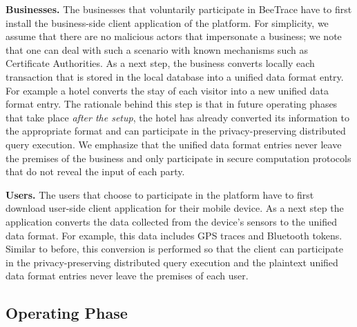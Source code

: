\documentclass[11pt,dvipdfmx]{article}  %
\newcommand{\sysname}{\textsf{BeeTrace}\xspace}
\begin{document}
\textbf{Businesses. }The businesses that voluntarily participate in \sysname have to first install the business-side client application of the platform. For simplicity, we assume that there are no malicious actors that impersonate a business; we note that one can deal with such a scenario with known mechanisms such as Certificate Authorities.
As a next step, the business converts locally each transaction that is stored in the local database into a unified data format entry. 
For example a hotel converts the stay of each visitor into a new unified data format entry. 
The rationale behind this step is that in future operating phases that take place \emph{after the setup}, the hotel has already converted its information to the appropriate format and can participate in the privacy-preserving distributed query execution.  
We emphasize that the unified data format entries never leave the premises of the business and only participate in secure computation protocols that do not reveal the input of each party.



\textbf{Users. }The users that choose to participate in the platform have to first download user-side client application for their mobile device. As a next step the application converts the data collected from the device's sensors to the unified data format. 
For example, this data includes GPS traces and Bluetooth tokens. 
Similar to before, this conversion is performed so that the client can participate in the privacy-preserving distributed query execution and the plaintext unified data format entries never leave the premises of each user. 



\subsection{Operating Phase}
\end{document}
